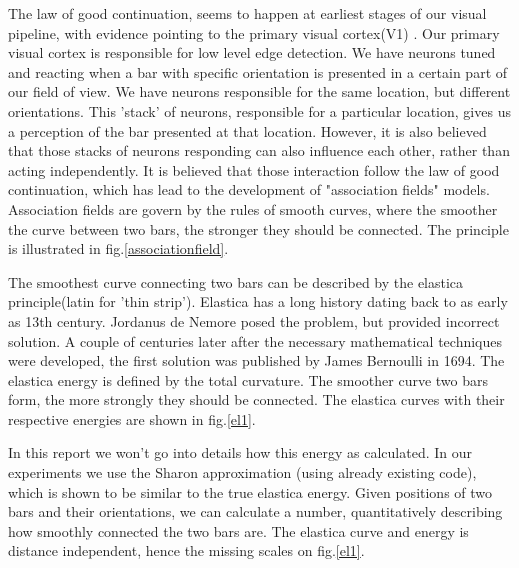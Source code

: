 The law of good continuation, seems to happen at earliest stages of our visual pipeline, with evidence pointing to the primary visual cortex(V1) \cite{field1993contour}. Our primary visual cortex is responsible for low level edge detection. We have neurons tuned and reacting when a bar with specific orientation is presented in a certain part of our field of view. We have neurons responsible for the same location, but different orientations. This 'stack' of neurons, responsible for a particular location, gives us a perception of the bar presented at that location. However, it is also believed that those stacks of neurons responding can also influence each other, rather than acting independently. It is believed that those interaction follow the law of good continuation, which has lead to the development of "association fields" models\cite{field1993contour}.  Association fields are govern by the rules of smooth curves, where the smoother the curve between two bars, the stronger they should be connected. The principle is illustrated in fig.\ref{associationfield}. 



The smoothest curve connecting two bars can be described by the elastica principle(latin for 'thin strip'\cite{levien2008elastica}). Elastica has a long history dating back to as early as 13th century\cite{levien2008elastica}. Jordanus de Nemore posed the problem, but provided incorrect solution. A couple of centuries later after the necessary mathematical techniques were developed, the first solution was published by James Bernoulli in 1694. The elastica energy is defined by the total curvature. The smoother curve two bars form, the more strongly they should be connected. The elastica curves with their respective energies are shown in fig.\ref{el1}. 


In this report we won't go into details how this energy as calculated. In our experiments we use the Sharon approximation\cite{sharon2000completion} (using already existing code\cite{elastica-code}), which is shown to be similar to the true elastica energy\cite{keemink2015unified}. Given positions of two bars and their orientations, we can calculate a number, quantitatively describing how smoothly connected the two bars are. The elastica curve and energy is distance independent, hence the missing scales on fig.\ref{el1}.

